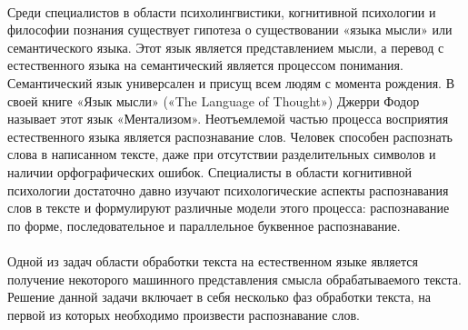 \paragraph{}
Среди специалистов в области психолингвистики, когнитивной психологии и философии познания существует гипотеза о существовании  «языка мысли» или семантического языка. Этот язык является представлением мысли, а перевод с естественного языка на семантический является процессом понимания. Семантический язык универсален и присущ всем людям с момента рождения. В своей книге «Язык мысли» («The Language of Thought»\cite{fodor}) Джерри Фодор называет этот язык «Ментализом». Неотъемлемой частью процесса восприятия естественного языка является распознавание слов. Человек способен распознать слова в написанном тексте, даже при отсутствии разделительных символов и наличии орфографических ошибок. Специалисты в области когнитивной психологии достаточно давно изучают психологические аспекты распознавания слов в тексте и формулируют различные модели этого процесса: распознавание по форме, последовательное и параллельное буквенное распознавание\cite{larson}. 
\paragraph{}
Одной из задач области обработки текста на естественном языке является получение некоторого машинного представления смысла обрабатываемого текста. Решение данной задачи включает в себя несколько фаз обработки текста, на первой из которых необходимо произвести распознавание слов.

\newpage
